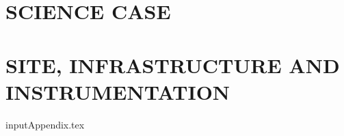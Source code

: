 \documentclass[url,11pt,fleqn]{book} %
\begin{document}




\part{SCIENCE CASE}
\label{part:SC}


\part{SITE, INFRASTRUCTURE AND INSTRUMENTATION}
\label{part:Instrumental}










\appendix
input{Appendix.tex}

\clearpage %
{}
%


%
%
%

%
\end{document}
